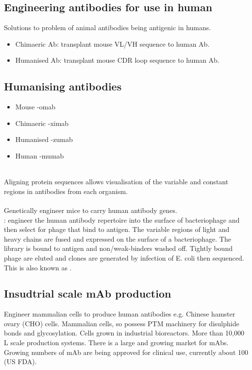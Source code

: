 \subsection{Engineering antibodies for use in human}
Solutions to problem of animal antibodies being antigenic in humans.
\begin{itemize}
    \item Chimaeric Ab: transplant mouse VL/VH sequence to human Ab.
    \item Humanised Ab: transplant mouse CDR loop sequence to human Ab.
\end{itemize}
\subsection{Humanising antibodies}
\begin{itemize}[noitemsep]
    \item Mouse -omab 
    \item Chimaeric -ximab 
    \item Humanised -zumab 
    \item Human -mumab
\end{itemize}
\\[.1in]
Aligning protein sequences allows visualisation of the variable and constant regions in antibodies from each organism.\\[.2in]
\\[.1in]
Genetically engineer mice to carry human antibody genes.\\[.2in]
: engineer the human antibody repertoire into the surface of bacteriophage and then select for phage that bind to antigen. The variable regions of light and heavy chains are fused and expressed on the surface of a bacteriophage. The library is bound to antigen and non/weak-binders washed off. Tightly bound phage are eluted and clones are generated by infection of E. coli then sequenced. This is also known as .
\subsection{Insudtrial scale mAb production}
Engineer mammalian cells to produce human antibodies e.g. Chinese hamster ovary (CHO) cells. Mammalian cells, so possess PTM machinery for disulphide bonds and glycosylation. Cells grown in industrial bioreactors. More than 10,000 L scale production systems. There is a large and growing market for mAbs. Growing numbers of mAb are being approved for clinical use, currently about 100 (US FDA).
